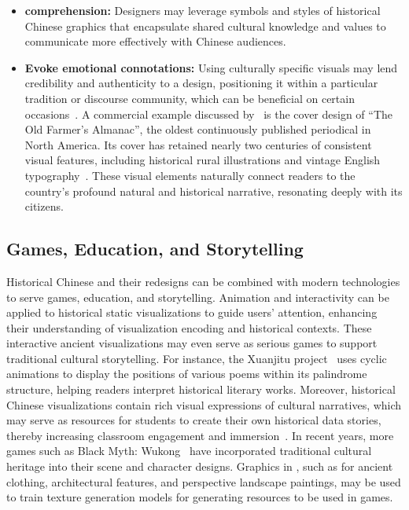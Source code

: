 \begin{itemize}[leftmargin=3.5mm]
    \item \textbf{ comprehension:}
    Designers may leverage symbols and styles of historical Chinese graphics that encapsulate shared cultural knowledge and values to communicate more effectively with Chinese audiences.
    
    \item \textbf{Evoke emotional connotations:}
Using culturally specific visuals may lend credibility and authenticity to a design, positioning it within a particular tradition or discourse community, which can be beneficial on certain occasions~\cite{Kostelnick2003Shaping}.
    A commercial example discussed by~\cite{Kostelnick2003Shaping} is the cover design of ``The Old Farmer's Almanac'', the oldest continuously published periodical in North America. 
    Its cover has retained nearly two centuries of consistent visual features, including historical rural illustrations and vintage English typography~\cite{Kostelnick2003Shaping}. 
    These visual elements naturally connect readers to the country's profound natural and historical narrative, resonating deeply with its citizens.
\end{itemize}




\subsection{Games, Education, and Storytelling}

Historical Chinese \itemTypePlural and their redesigns can be combined with modern technologies to serve games, education, and storytelling.
Animation and interactivity can be applied to historical static visualizations to guide users' attention, enhancing their understanding of visualization encoding and historical contexts. 
These interactive ancient visualizations may even serve as serious games to support traditional cultural storytelling. 
For instance, the Xuanjitu project~\cite{RorySaur2022Xuanjitu} uses cyclic animations to display the positions of various poems within its palindrome structure, helping readers interpret historical literary works.
Moreover, historical Chinese visualizations contain rich visual expressions of cultural narratives, which may serve as resources for students to create their own historical data stories, thereby increasing classroom engagement and immersion~\cite{Lu2011ShadowStory}.
In recent years, more games such as Black Myth: Wukong~\cite{GameScience2024Black} have incorporated traditional cultural heritage into their scene and character designs. 
Graphics in \datasetName, such as for ancient clothing, architectural features, and perspective landscape paintings, may be used to train texture generation models for generating resources to be used in games.


